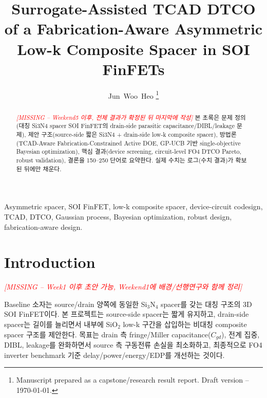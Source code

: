 \documentclass[journal]{IEEEtran}
\newcommand{\missing}[1]{\textcolor{red}{\textit{[MISSING -- #1]}}}
\begin{document}
\title{Surrogate-Assisted TCAD DTCO of a Fabrication-Aware Asymmetric \\
Low-k Composite Spacer in SOI FinFETs}

\author{Jun~Woo~Heo
\thanks{Manuscript prepared as a capstone/research result report. Draft version -- \today.}}


\maketitle

\begin{abstract}
\missing{Weekend5 이후, 전체 결과가 확정된 뒤 마지막에 작성}
본 초록은 문제 정의(대칭 Si3N4 spacer SOI FinFET의 drain-side parasitic capacitance/DIBL/leakage 문제), 제안 구조(source-side 짧은 Si3N4 + drain-side low-k composite spacer), 방법론(TCAD-Aware Fabrication-Constrained Active DOE, GP-UCB 기반 single-objective Bayesian optimization), 핵심 결과(device screening, circuit-level FO4 DTCO Pareto, robust validation), 결론을 150--250 단어로 요약한다. 실제 수치는 로그(수치 결과)가 확보된 뒤에만 채운다.
\end{abstract}

\begin{IEEEkeywords}
Asymmetric spacer, SOI FinFET, low-k composite spacer, device-circuit codesign, TCAD, DTCO, Gaussian process, Bayesian optimization, robust design, fabrication-aware design.
\end{IEEEkeywords}

\section{Introduction}
\label{sec:intro}

\missing{Week1 이후 초안 가능, Weekend1에 배경/선행연구와 함께 정리}

Baseline 소자는 source/drain 양쪽에 동일한 Si$_3$N$_4$ spacer를 갖는 대칭 구조의 3D SOI FinFET이다. 본 프로젝트는 source-side spacer는 짧게 유지하고, drain-side spacer는 길이를 늘리면서 내부에 SiO$_2$ low-k 구간을 삽입하는 비대칭 composite spacer 구조를 제안한다. 목표는 drain 측 fringe/Miller capacitance($C_{gd}$), 전계 집중, DIBL, leakage를 완화하면서 source 측 구동전류 손실을 최소화하고, 최종적으로 FO4 inverter benchmark 기준 delay/power/energy/EDP를 개선하는 것이다.
\end{document}
